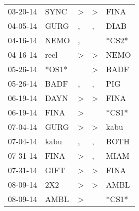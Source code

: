\begin{supertabular}{p{0.07\textwidth}p{0.06\textwidth}p{0.02\textwidth}p{0.02\textwidth}p{0.06\textwidth}}
          03-20-14\textsuperscript{} &           SYNC\textsuperscript{} &     \textgreater &     \textgreater &           FINA\textsuperscript{} \\
          04-05-14\textsuperscript{} &           GURG\textsuperscript{} &                , &                , &           DIAB\textsuperscript{} \\
          04-16-14\textsuperscript{} &           NEMO\textsuperscript{} &                , &                  &                            *CS2* \\
          04-16-14\textsuperscript{} &           reel\textsuperscript{} &     \textgreater &     \textgreater &           NEMO\textsuperscript{} \\
          05-26-14\textsuperscript{} &                            *OS1* &                  &     \textgreater &           BADF\textsuperscript{} \\
          05-26-14\textsuperscript{} &           BADF\textsuperscript{} &                , &                , &            PIG\textsuperscript{} \\
          06-19-14\textsuperscript{} &           DAYN\textsuperscript{} &     \textgreater &     \textgreater &           FINA\textsuperscript{} \\
          06-19-14\textsuperscript{} &           FINA\textsuperscript{} &     \textgreater &                  &                            *CS1* \\
          07-04-14\textsuperscript{} &           GURG\textsuperscript{} &     \textgreater &     \textgreater &           kabu\textsuperscript{} \\
          07-04-14\textsuperscript{} &           kabu\textsuperscript{} &                , &                , &           BOTH\textsuperscript{} \\
          07-31-14\textsuperscript{} &           FINA\textsuperscript{} &     \textgreater &                , &           MIAM\textsuperscript{} \\
          07-31-14\textsuperscript{} &           GIFT\textsuperscript{} &     \textgreater &     \textgreater &           FINA\textsuperscript{} \\
          08-09-14\textsuperscript{} &            2X2\textsuperscript{} &     \textgreater &     \textgreater &           AMBL\textsuperscript{} \\
          08-09-14\textsuperscript{} &           AMBL\textsuperscript{} &     \textgreater &                  &                            *CS1* \\

\end{supertabular}
